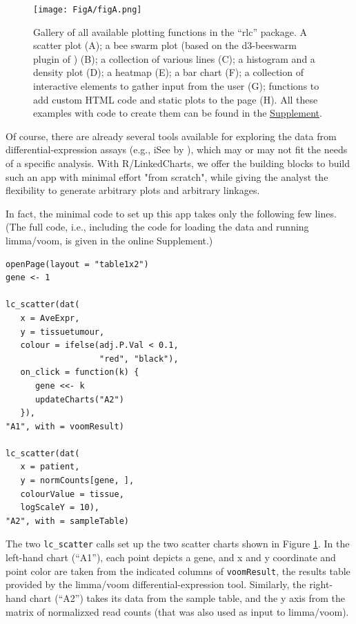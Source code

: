 \documentclass[twocolumn,10pt]{article}
\newcommand{\Supplement}{\href{https://anders-biostat.github.io/lc-paper/}{Supplement}}
\begin{document}
\begin{figure}
	\texttt{[image: FigA/figA.png]}
	\caption{Gallery of all available plotting functions in the ``rlc'' package. A scatter plot (A); a bee swarm plot (based on the d3-beeswarm plugin of \citet{lebeau_2017}) (B); a collection of various lines (C); a histogram and a density plot (D); a heatmap (E); a bar chart (F); a collection of interactive elements to gather input from the user (G); functions to add custom HTML code and static plots to the page (H). All these examples with code to create them can be found in the \Supplement.}
	\label{FigA}
\end{figure}

Of course, there are already several tools available for exploring the data from differential-expression assays (e.g., iSee by \citet{rue_2018}), which may or may not fit the needs of a specific analysis. With R/LinkedCharts, we offer the building blocks to build such an app with minimal effort "from scratch", while giving the analyst the flexibility to generate arbitrary plots and arbitrary linkages.

In fact, the minimal code to set up this app takes only the following few lines. (The full code, i.e., including the code for loading the data and running limma/voom, is given in the online Supplement.)

\begin{verbatim}
openPage(layout = "table1x2")
gene <- 1

lc_scatter(dat(
   x = AveExpr,
   y = tissuetumour,
   colour = ifelse(adj.P.Val < 0.1, 
                   "red", "black"),
   on_click = function(k) {
      gene <<- k
      updateCharts("A2")
   }),
"A1", with = voomResult)

lc_scatter(dat(
   x = patient,
   y = normCounts[gene, ],
   colourValue = tissue, 
   logScaleY = 10),
"A2", with = sampleTable)
\end{verbatim}

The two \texttt{lc_scatter} calls set up the two scatter charts shown in Figure \ref{FigA}. In the left-hand chart (``A1''), each point depicts a gene, and x and y coordinate and point color are taken from the indicated columns of \texttt{voomResult}, the results table provided by the limma/voom differential-expression tool. Similarly, the right-hand chart (``A2'') takes its data from the sample table, and the y axis from the matrix of normalizxed read counts (that was also used as input to limma/voom).
\end{document}
